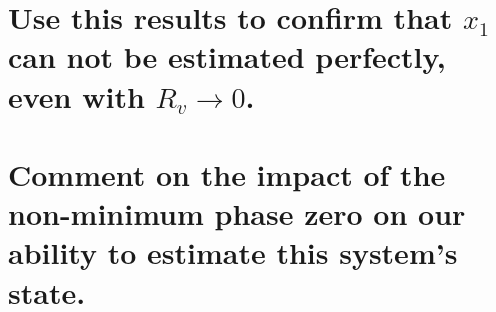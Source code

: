 \documentclass[12pt,letterpaper, onecolumn]{exam}
\begin{document}
\begin{questions}
\begin{parts}
        \part{Use this results to confirm that $x_1$ can not be estimated perfectly, even with
            $R_v \rightarrow 0$.}

        \part{Comment on the impact of the non-minimum phase zero on our ability to estimate this system's state.}
    \end{parts}
\end{questions}
\end{document}

